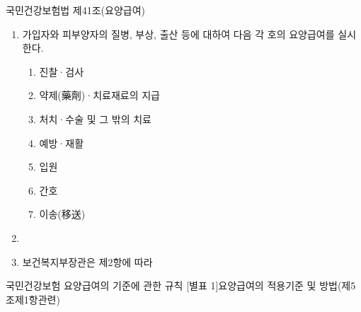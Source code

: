 국민건강보험법     제41조(요양급여)
\begin{enumerate}[①]\tightlist
\item 가입자와 피부양자의 질병, 부상, 출산 등에 대하여 다음 각 호의 요양급여를 실시한다.
	\begin{enumerate}[1.]\tightlist
	\item 진찰·검사
	\item 약제(藥劑)·치료재료의 지급
	\item 처치·수술 및 그 밖의 치료
	\item 예방·재활
	\item 입원
	\item 간호
	\item 이송(移送)
	\end{enumerate}
\item {} 
\item 보건복지부장관은 제2항에 따라 
\end{enumerate}

국민건강보험 요양급여의 기준에 관한 규칙  [별표 1]요양급여의 적용기준 및 방법(제5조제1항관련)

